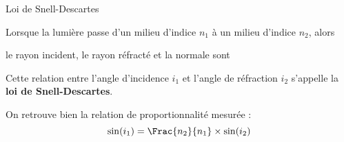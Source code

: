 \vspace*{-8pt}
\begin{doc}{Loi de Snell-Descartes}
  \vspace*{-24pt}
  \begin{encart}
    Lorsque la lumière passe d'un milieu d'indice $n_1$ à un milieu d'indice $n_2$, alors
    \begin{listePoints}
      \item le rayon incident, le rayon réfracté et la normale sont \dotfill %
      \item \dotfill
    \end{listePoints}
    
    Cette relation entre l'angle d'incidence $i_1$ et l'angle de réfraction $i_2$ s'appelle la \textbf{loi de Snell-Descartes}.
  \end{encart}
  
  On retrouve bien la relation de proportionnalité mesurée :
  \begin{equation*}
    \sin(i_1) = \Frac{n_2}{n_1} \times \sin(i_2)
  \end{equation*}
\end{doc}

